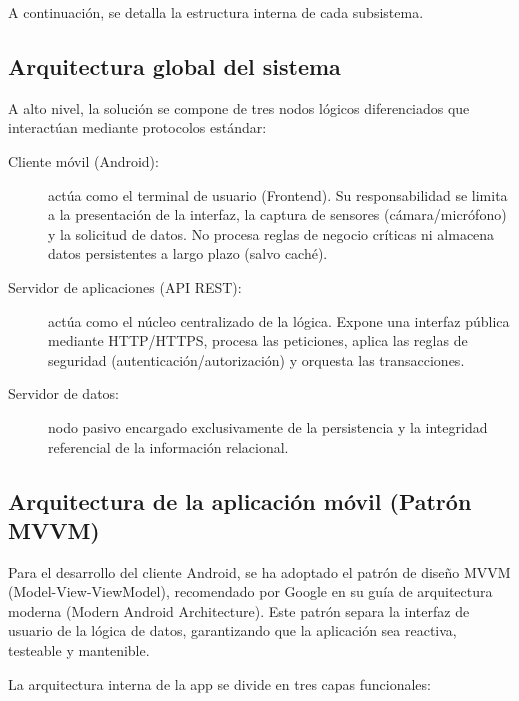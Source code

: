 A continuación, se detalla la estructura interna de cada subsistema.

\subsection{Arquitectura global del sistema}
A alto nivel, la solución se compone de tres nodos lógicos diferenciados que interactúan mediante protocolos estándar:

\begin{description}
    \item[Cliente móvil (Android):] actúa como el terminal de usuario (Frontend). Su responsabilidad se limita a la presentación de la interfaz, la captura de sensores (cámara/micrófono) y la solicitud de datos. No procesa reglas de negocio críticas ni almacena datos persistentes a largo plazo (salvo caché).
    
    \item[Servidor de aplicaciones (API REST):] actúa como el núcleo centralizado de la lógica. Expone una interfaz pública mediante HTTP/HTTPS, procesa las peticiones, aplica las reglas de seguridad (autenticación/autorización) y orquesta las transacciones.
    
    \item[Servidor de datos:] nodo pasivo encargado exclusivamente de la persistencia y la integridad referencial de la información relacional.
\end{description}

\subsection{Arquitectura de la aplicación móvil (Patrón MVVM)}
Para el desarrollo del cliente Android, se ha adoptado el patrón de diseño MVVM (Model-View-ViewModel), recomendado por Google en su guía de arquitectura moderna \cite{android_arch_guide}(Modern Android Architecture). Este patrón separa la interfaz de usuario de la lógica de datos, garantizando que la aplicación sea reactiva, testeable y mantenible.

La arquitectura interna de la app se divide en tres capas funcionales:

